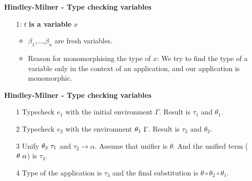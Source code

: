 \documentclass{beamer}
\begin{document}
\begin{frame}[fragile]{\bf Hindley-Milner - Type checking variables}
\begin{enumerate}
\item[1:] $t$ {\bf is a variable} $x$ 
\begin{figure}[h]
\label{fig:sat-reduction-edges}
\end{figure}
\begin{itemize}
\item \(\beta_1\),\(\ldots\),\(\beta_n\) are fresh variables.
\item Reason for monomorphising the type of $x$: We try to find the type of
a variable only in the context of an application, and our application
is monomorphic.
\end{itemize}
\end{enumerate}
\end{frame}

\begin{frame}[fragile]{\bf Hindley-Milner - Type checking variables}
\begin{enumerate}
\item[1] Typecheck \(e_1\) with the initial environment \(\Gamma\). Result is \(\tau_1\) and \(\theta_1\).
\item[2] Typecheck \(e_2\) with the environment \(\theta_1 $ $ \Gamma\). Result is \(\tau_2\) and \(\theta_2\).
\item[3] Unify \(\theta_2 $ $ \tau_1\) and \(\tau_2 \rightarrow \alpha\). Assume that unifier is \(\theta\). And the unified term (\(\theta $ $ \alpha\)) is \(\tau_3\).
\item[4] Type of the application is \(\tau_3\) and the final substitution is \(\theta \circ \theta_2 \circ \theta_1 \).
\end{enumerate}
\end{frame}
\end{document}
